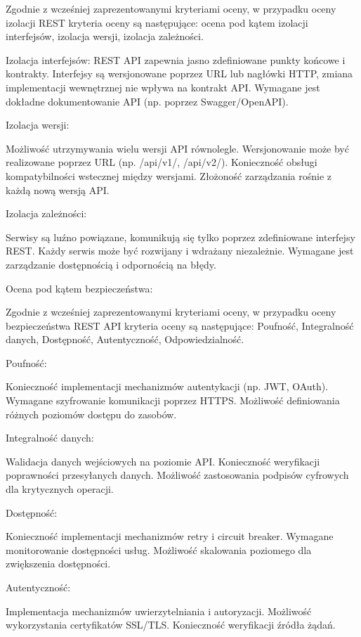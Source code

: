 \documentclass[runningheads,12pt]{llncs}
\begin{document}
Zgodnie z wcześniej zaprezentowanymi kryteriami oceny, w przypadku oceny izolacji REST kryteria oceny są następujące: ocena pod kątem izolacji interfejsów, izolacja wersji, izolacja zależności.

Izolacja interfejsów: REST API zapewnia jasno zdefiniowane punkty końcowe i kontrakty. Interfejsy są wersjonowane poprzez URL lub nagłówki HTTP, zmiana implementacji wewnętrznej nie wpływa na kontrakt API. Wymagane jest dokładne dokumentowanie API (np. poprzez Swagger/OpenAPI). ~\cite[p. 124]{richardson2013rest}

Izolacja wersji: 

Możliwość utrzymywania wielu wersji API równolegle. Wersjonowanie może być realizowane poprzez URL (np. /api/v1/, /api/v2/). Konieczność obsługi kompatybilności wstecznej między wersjami. Złożoność zarządzania rośnie z każdą nową wersją API. ~\cite[p. 89]{richardson2013rest}\

Izolacja zależności: 

Serwisy są luźno powiązane, komunikują się tylko poprzez zdefiniowane interfejsy REST. Każdy serwis może być rozwijany i wdrażany niezależnie. Wymagane jest zarządzanie dostępnością i odpornością na błędy. ~\cite[p. 156]{newman2015building}

Ocena pod kątem bezpieczeństwa:

Zgodnie z wcześniej zaprezentowanymi kryteriami oceny, w przypadku oceny bezpieczeństwa REST API kryteria oceny są następujące: Poufność, Integralność danych, Dostępność, Autentyczność, Odpowiedzialność.

Poufność: 

Konieczność implementacji mechanizmów autentykacji (np. JWT, OAuth). Wymagane szyfrowanie komunikacji poprzez HTTPS. Możliwość definiowania różnych poziomów dostępu do zasobów. ~\cite[p. 245]{newman2015building}

Integralność danych: 

Walidacja danych wejściowych na poziomie API. Konieczność weryfikacji poprawności przesyłanych danych. Możliwość zastosowania podpisów cyfrowych dla krytycznych operacji. ~\cite[p. 267]{newman2015building}

Dostępność: 

Konieczność implementacji mechanizmów retry i circuit breaker. Wymagane monitorowanie dostępności usług. Możliwość skalowania poziomego dla zwiększenia dostępności. ~\cite[p. 178]{richardson2013rest}

Autentyczność: 

Implementacja mechanizmów uwierzytelniania i autoryzacji. Możliwość wykorzystania certyfikatów SSL/TLS. Konieczność weryfikacji źródła żądań. ~\cite[p. 289]{newman2015building}
\end{document}
